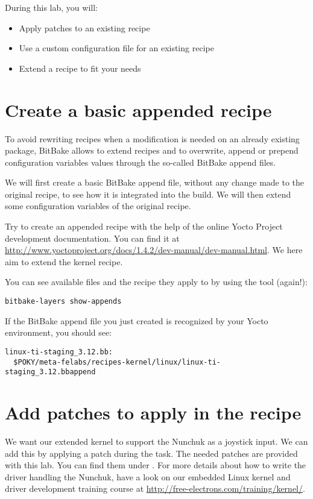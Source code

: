 
During this lab, you will:
\begin{itemize}
  \item Apply patches to an existing recipe
  \item Use a custom configuration file for an existing recipe
  \item Extend a recipe to fit your needs
\end{itemize}

\section{Create a basic appended recipe}

To avoid rewriting recipes when a modification is needed on an already existing
package, BitBake allows to extend recipes and to overwrite, append or prepend
configuration variables values through the so-called BitBake append files.

We will first create a basic BitBake append file, without any change made
to the original recipe, to see how it is integrated into the build. We will then
extend some configuration variables of the original recipe.

Try to create an appended recipe with the help of the online Yocto
Project development documentation. You can find it at
\url{http://www.yoctoproject.org/docs/1.4.2/dev-manual/dev-manual.html}. We here
aim to extend the  kernel recipe.

You can see available  files and the recipe they apply to by
using the  tool (again!):
\begin{verbatim}
bitbake-layers show-appends
\end{verbatim}

If the BitBake append file you just created is recognized by your Yocto
environment, you should see:
\begin{verbatim}
linux-ti-staging_3.12.bb:
  $POKY/meta-felabs/recipes-kernel/linux/linux-ti-staging_3.12.bbappend
\end{verbatim}

\section{Add patches to apply in the recipe}

We want our extended  kernel to support the Nunchuk as
a joystick input. We can add this by applying a patch during the
 task. The needed patches are provided with this lab. You can
find them under . For more details about
how to write the driver handling the Nunchuk, have a look on our embedded Linux
kernel and driver development training course at
\url{http://free-electrons.com/training/kernel/}.

